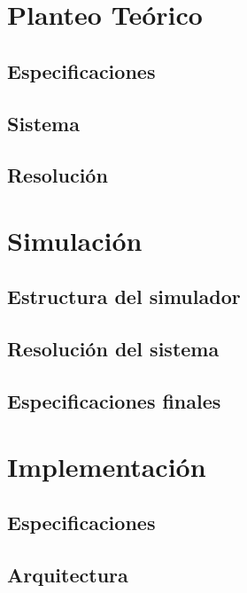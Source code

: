 \documentclass[a4paper]{article}
\begin{document}
\section{Planteo Teórico}
\label{sec:teo}


\subsection{Especificaciones}


\subsection{Sistema}


\subsection{Resolución}

\section{Simulación}
\label{sec:sim}
\subsection{Estructura del simulador}


\subsection{Resolución del sistema}


\subsection{Especificaciones finales}

\section{Implementación}
\label{sec:imp}

\subsection{Especificaciones}

\subsection{Arquitectura}
\end{document}
